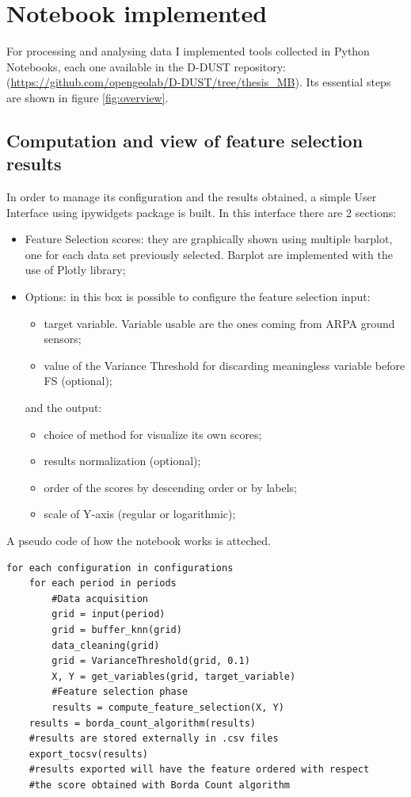 \section{Notebook implemented}
For processing and analysing data I implemented tools collected in Python Notebooks, each one available in the D-DUST repository:
(\url{https://github.com/opengeolab/D-DUST/tree/thesis_MB}).\newline
Its essential steps are shown in figure \ref{fig:overview}.

\subsection{Computation and view of feature selection results}
In order to manage its configuration and the results obtained, a simple User Interface using ipywidgets package is built.
In this interface there are 2 sections:
\begin{itemize}
\item Feature Selection scores: they are graphically shown using multiple barplot, one for each data set previously selected. Barplot are implemented with the use of Plotly library; 
\item Options: in this box is possible to configure the feature selection input:
\begin{itemize}
\item target variable. Variable usable are the ones coming from ARPA ground sensors;
\item value of the Variance Threshold for discarding meaningless variable before FS (optional);
\end{itemize}
and the output:
\begin{itemize}
\item choice of method for visualize its own scores;
\item results normalization (optional);
\item order of the scores by descending order or by labels;
\item scale of Y-axis (regular or logarithmic);
\end{itemize}
\end{itemize}
A pseudo code of how the notebook works is atteched.
\begin{verbatim}
for each configuration in configurations
    for each period in periods
        #Data acquisition
        grid = input(period)
        grid = buffer_knn(grid)
        data_cleaning(grid)
        grid = VarianceThreshold(grid, 0.1)
        X, Y = get_variables(grid, target_variable)
        #Feature selection phase
        results = compute_feature_selection(X, Y)
    results = borda_count_algorithm(results)
    #results are stored externally in .csv files
    export_tocsv(results) 
    #results exported will have the feature ordered with respect
    #the score obtained with Borda Count algorithm
\end{verbatim}
